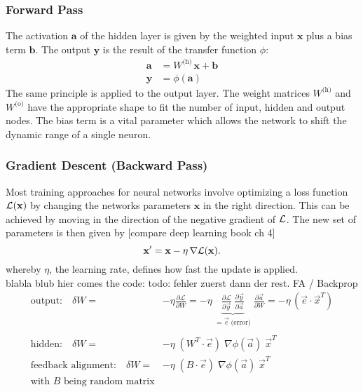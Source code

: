 \subsubsection{Forward Pass}
The activation $\mathbf{a}$ of the hidden layer is given by the weighted input $\mathbf{x}$ plus a bias term $\mathbf{b}$. The output $\mathbf{y}$ is the result of the transfer function $\phi$:
\begin{align}
\mathbf{a} &= W^{\text{(h)}} \, \mathbf{x} + \mathbf{b} \\
\mathbf{y} &= \phi(\mathbf{a})
\end{align} 
The same principle is applied to the output layer. The weight matrices $W^{\text{(h)}}$ and $ W^{\text{(o)}}$ have the appropriate shape to fit the number of input, hidden and output nodes. The bias term is a vital parameter which allows the network to shift the dynamic range of a single neuron.

\subsubsection{Gradient Descent (Backward Pass)}

Most training approaches for neural networks involve optimizing a loss function $\mathcal{L}(\mathbf{x})$ by changing the networks parameters $\mathbf{x}$ in the right direction. This can be achieved by moving in the direction of the negative gradient of $\mathcal{L}$. The new set of parameters is then given by [compare deep learning book ch 4]
\begin{equation}
\mathbf{x'} = \mathbf{x} - \eta \, \nabla\mathcal{L}(\mathbf{x}).
\end{equation}
whereby $\eta$, the learning rate, defines how fast the update is applied.\\

blabla blub hier comes the code:
todo: fehler zuerst dann der rest. FA / Backprop
\begin{align*}
\text{output:} \quad \delta W =& - \eta \frac{\partial \mathcal{L}}{\partial W} 
= - \eta \;
\underbrace{\frac{\partial\mathcal{L}}{\partial \vec{y}} \;
	\frac{\partial \vec{y}}{\partial \vec{a} }}_{=\vec{e}\; \text{(error)}} \;
\frac{\partial \vec{a}}{\partial W}
= - \eta \, (\vec{e} \cdot \vec{x}^T)\\
\\ 
\text{hidden:} \quad \delta W =& - \eta \;
(W^T \cdot \vec{e}) \;
\nabla \phi(\vec{a}) \;
\vec{x}^T\\
\text{feedback alignment:} \quad \delta W =& - \eta \;
(B \cdot \vec{e}) \;
\nabla \phi(\vec{a}) \;
\vec{x}^T\;\\
\text{with } B \text{ being random matrix}
\end{align*}

